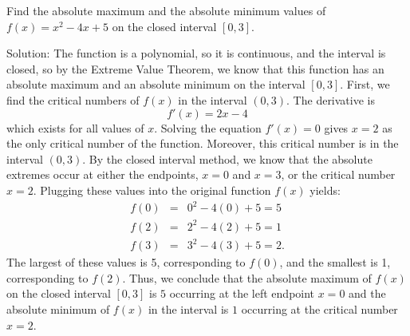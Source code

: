 \documentclass{ximera}
\begin{document}
\begin{example}[example 1] Find the absolute maximum and the absolute minimum values of $f(x) = x^2 - 4x + 5$ on the closed interval $[0, 3]$.

Solution:  The function is a polynomial, so it is continuous, and the interval is closed, 
so by the Extreme Value Theorem, we know that this function has an absolute maximum and an absolute minimum on the interval $[0,3]$.
First, we find the critical numbers of $f(x)$ in the interval $(0, 3)$. 
The derivative is 
\[
f'(x) = 2x - 4
\]
which exists for all values of $x$.
Solving the equation $f'(x) =0$ gives $x=2$ as the only critical number of the function.
Moreover, this critical number is in the interval $(0,3)$.
By the closed interval method, we know that the absolute extremes occur at either the endpoints, $x=0$ and $x = 3$, or the critical number $x = 2$.  
Plugging these values into the original function $f(x)$ yields:
\begin{eqnarray*}
f(0) &=& 0^2 - 4(0) + 5 =5\\
f(2) &=& 2^2 - 4(2) + 5 = 1\\
f(3) &=& 3^2 - 4(3) + 5 = 2.
\end{eqnarray*}
The largest of these values is 5, corresponding to $f(0)$, and the smallest is 1, corresponding to $f(2)$. 
Thus, we conclude that the absolute maximum of $f(x)$ on the closed interval $[0,3]$ is $5$ occurring 
at the left endpoint $x = 0$ and the absolute minimum of $f(x)$ in the interval is $1$
occurring at the critical number $x = 2$.
\begin{image}
\end{image}
\end{example}
\end{document}

